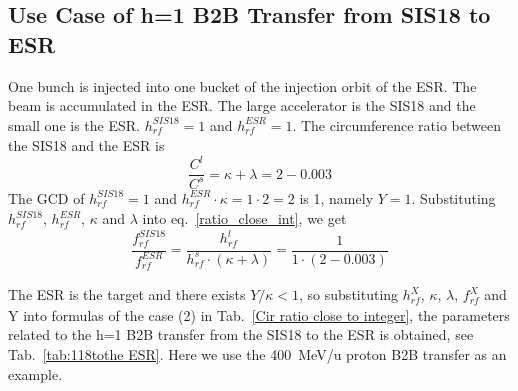 \subsection{Use Case of h=1 B2B Transfer from SIS18 to ESR} 
One bunch is injected into one bucket of the injection orbit of the ESR. The beam is accumulated in the ESR. The large accelerator is the SIS18 and the small one is the ESR. $h^{\mathit{SIS18}}_\mathit{rf}=1$ and $h^{\mathit{ESR}}_\mathit{rf}=1$. The circumference ratio between the SIS18 and the ESR is
\begin{equation}
\frac{C^l}{C^s}=\kappa + \lambda =2-0.003
\end{equation}
The GCD of $h^{\mathit{SIS18}}_\mathit{rf}=1$ and $h^{\mathit{ESR}}_\mathit{rf}\cdot \kappa=1\cdot 2=2$ is 1, namely $Y=1$. Substituting $h^{\mathit{SIS18}}_\mathit{rf}$, $h^{\mathit{ESR}}_\mathit{rf}$, $\kappa$ and $\lambda$ into eq.~\ref{ratio_close_int}, we get
\begin{equation}
\frac {f_{\mathit{rf}}^{\mathit{SIS18}}}{f_{\mathit{rf}}^{\mathit{ESR}}}= \frac{h^l_\mathit{rf}}{h^s_\mathit{rf} \cdot (\kappa+ \lambda)}=\frac {1}{1 \cdot(2-0.003)}
\end{equation}

The ESR is the target and there exists $Y/\kappa<1$, so substituting $h^X_\mathit{rf}$, $\kappa$, $\lambda$, $f_{\mathit{rf}}^{X}$ and Y into formulas of the case (2) in Tab.~\ref{Cir ratio close to integer}, the parameters related to the h=1 B2B transfer from the SIS18 to the ESR is obtained, see Tab.~\ref{tab:118tothe ESR}. Here we use the \SI{400}{MeV/\atomicmassunit} proton B2B transfer as an example. 

